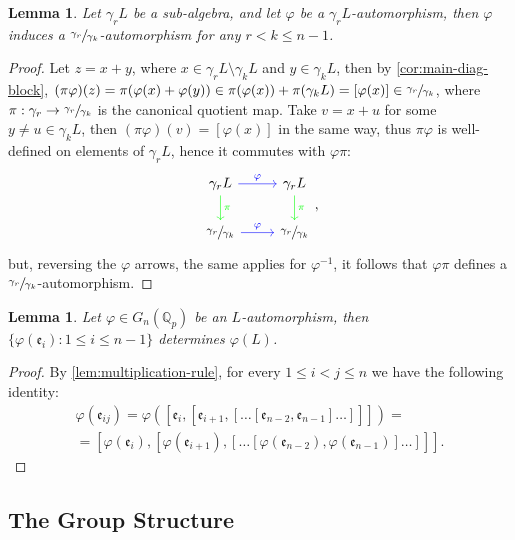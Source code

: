 \documentclass{article}
\newtheorem{lemma}[theorem]{Lemma}
\newcommand{\e}{\mathfrak{e}}
\begin{document}
\begin{lemma}
\label{lem:quotient-automorphism}
Let $\gamma_r{L}$ be a sub-algebra, and let $\varphi$ be a $\gamma_r{L}$-automorphism, then $\varphi$ induces a $\sfrac{\gamma_r}{\gamma_k}$-automorphism for any $r<k\leq{n-1}$.
\end{lemma}
\begin{proof}
Let $z=x+y$, where $x\in\gamma_r{L}\setminus\gamma_k{L}$ and $y\in\gamma_k{L}$, then by \ref{cor:main-diag-block}, $(\pi\varphi)(z)=\pi(\varphi(x)+\varphi(y))\in\pi(\varphi(x))+\pi(\gamma_k{L})=[\varphi(x)]\in\sfrac{\gamma_r}{\gamma_k}$, where $\pi:\gamma_r\rightarrow\sfrac{\gamma_r}{\gamma_k}$ is the canonical quotient map.
Take $v=x+u$ for some $y\neq{u}\in\gamma_k{L}$, then $(\pi\varphi)(v)=[\varphi(x)]$ in the same way, thus $\pi\varphi$ is well-defined on elements of $\gamma_r{L}$, hence it commutes with $\varphi\pi$:
\[
\begin{tikzcd}
\gamma_r{L} \arrow[r, "\varphi", blue] \arrow[d, "\pi", green]
& \gamma_r{L}
\arrow[d, "\pi", green] \\
\sfrac{\gamma_r}{\gamma_k} \arrow[r, red, "\varphi", blue]
& \sfrac{\gamma_r}{\gamma_k}
\end{tikzcd},
\]
but, reversing the $\varphi$ arrows, the same applies for $\varphi^{-1}$, it follows that $\varphi\pi$ defines a $\sfrac{\gamma_r}{\gamma_k}$-automorphism.
\end{proof}
\begin{lemma}
\label{lem:diff-1-images}
Let $\varphi\in{G}_n(\mathbb{Q}_p)$ be an ${L}$-automorphism, then $\{\varphi(\e_i) : 1\leq{i}\leq{n}-1\}$ determines $\varphi({L})$. 
\end{lemma}
\begin{proof}
By \ref{lem:multiplication-rule}, for every $1\leq{i}<j\leq{n}$ we have the following identity: 
\begin{equation*}
\begin{split}\varphi(\e_{ij})=\varphi([\e_i,[\e_{i+1},[\dots[\e_{n-2},\e_{n-1}]\dots]]])=\\
=[\varphi(\e_i),[\varphi(\e_{i+1}),[\dots[\varphi(\e_{n-2}),\varphi(\e_{n-1})]\dots]]].
\end{split}
\end{equation*}
\end{proof}
\subsection{The Group Structure}
\end{document}
